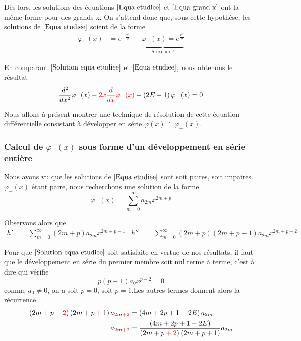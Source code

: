 \documentclass[../Notesdecours.tex]{subfiles}
\begin{document}
Dès lors, les solutions des équations $\eqref{Equa etudiee}$ et $\eqref{Equa grand x}$ ont la même forme pour des grands x. On s'attend donc que, sous cette hypothèse, les solutions de $\eqref{Equa etudiee}$ soient de la forme
\begin{align}
    \label{Solution equa etudiee}
    \varphi_-(x) &= e^{-\frac{x^2}{2}} & &\underbrace{\varphi_+(x) = e^{\frac{x^2}{2}}}_{\text{A exclure !}}
\end{align}

En comparant $\eqref{Solution equa etudiee}$ et $\eqref{Equa etudiee}$, nous obtenons le résultat
\begin{equation}
    \frac{d^2}{dx^2}\varphi_-(x) \color{red}- 2x\frac{d}{dx}\varphi_-(x) \color{black} + \left(2E-1\right)\varphi_-(x) = 0
\end{equation}

Nous allons à présent montrer une technique de résolution de cette équation différentielle consistant à développer en série $\varphi(x) \doteq \varphi_-(x)$.

\subsubsection{Calcul de $\varphi_-(x)$ sous forme d'un développement en série entière}

Nous avons vu que les solutions de $\eqref{Equa etudiee}$ sont soit paires, soit impaires. $\varphi_-(x)$ étant paire, nous recherchons une solution de la forme
\begin{equation}
    \varphi_-(x) = \sum_{m = 0}^\infty a_{2m}x^{2m+p}
\end{equation}

Observons alors que
\begin{align}
    h' &= \sum_{m = 0}^{\infty}\left(2m+p\right)a_{2m}x^{2m+p-1} & h'' &= \sum_{m = 0}^{\infty}\left(2m+p\right)\left(2m+p-1\right)a_{2m}x^{2m+p-2}
\end{align}

Pour que $\eqref{Solution equa etudiee}$ soit satisfaite en vertue de nos résultats, il faut que le développement en série du premier membre soit nul terme à terme, c'est à dire qui vérifie
\begin{equation}
    p(p-1)a_0x^{p-2} = 0
\end{equation}
comme $a_0 \neq 0$, on a soit $p = 0$, soit $p = 1$.Les autres termes donnent alors la récurrence
\begin{align}
    \left(2m+p\color{red}+2\color{black}\right)\left(2m+p\color{red}+\color{black}1\right)a_{2m\color{red}+2\color{black}}&= \left(4m+2p+1-2E\right)a_{2m} \\
    a_{2m\color{red}+2\color{black}} &= \frac{\left(4m+2p+1-2E\right)}{\left(2m+p\color{red}+2\color{black}\right)\left(2m+p\color{red}+\color{black}1\right)}a_{2m}  \label{recurrence}
\end{align}
\end{document}
